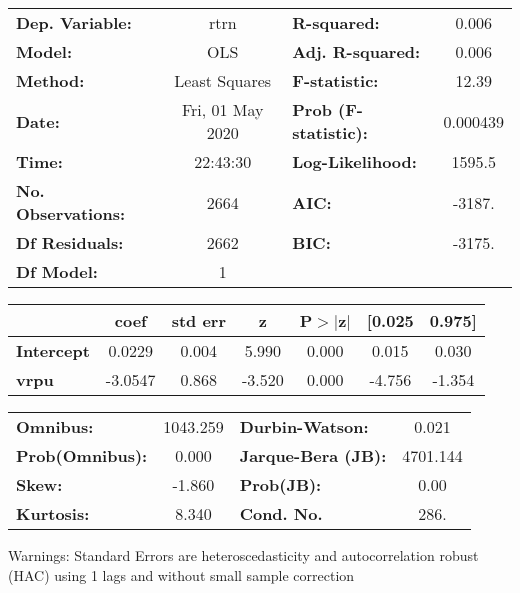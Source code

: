 \begin{center}
\begin{tabular}{lclc}
\toprule
\textbf{Dep. Variable:}    &       rtrn       & \textbf{  R-squared:         } &     0.006   \\
\textbf{Model:}            &       OLS        & \textbf{  Adj. R-squared:    } &     0.006   \\
\textbf{Method:}           &  Least Squares   & \textbf{  F-statistic:       } &     12.39   \\
\textbf{Date:}             & Fri, 01 May 2020 & \textbf{  Prob (F-statistic):} &  0.000439   \\
\textbf{Time:}             &     22:43:30     & \textbf{  Log-Likelihood:    } &    1595.5   \\
\textbf{No. Observations:} &        2664      & \textbf{  AIC:               } &    -3187.   \\
\textbf{Df Residuals:}     &        2662      & \textbf{  BIC:               } &    -3175.   \\
\textbf{Df Model:}         &           1      & \textbf{                     } &             \\
\bottomrule
\end{tabular}
\begin{tabular}{lcccccc}
                   & \textbf{coef} & \textbf{std err} & \textbf{z} & \textbf{P$> |$z$|$} & \textbf{[0.025} & \textbf{0.975]}  \\
\midrule
\textbf{Intercept} &       0.0229  &        0.004     &     5.990  &         0.000        &        0.015    &        0.030     \\
\textbf{vrpu}      &      -3.0547  &        0.868     &    -3.520  &         0.000        &       -4.756    &       -1.354     \\
\bottomrule
\end{tabular}
\begin{tabular}{lclc}
\textbf{Omnibus:}       & 1043.259 & \textbf{  Durbin-Watson:     } &    0.021  \\
\textbf{Prob(Omnibus):} &   0.000  & \textbf{  Jarque-Bera (JB):  } & 4701.144  \\
\textbf{Skew:}          &  -1.860  & \textbf{  Prob(JB):          } &     0.00  \\
\textbf{Kurtosis:}      &   8.340  & \textbf{  Cond. No.          } &     286.  \\
\bottomrule
\end{tabular}
\end{center}

Warnings: \newline
 [1] Standard Errors are heteroscedasticity and autocorrelation robust (HAC) using 1 lags and without small sample correction